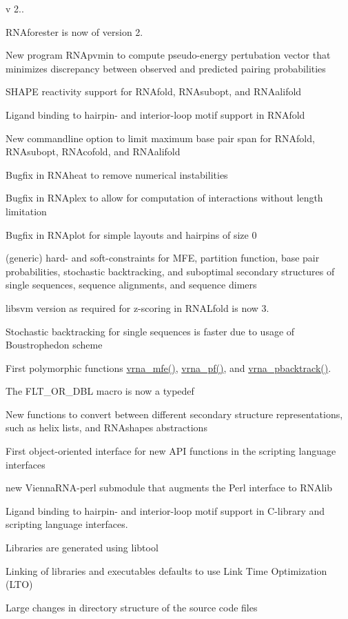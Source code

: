 v 2..
\begin{DoxyItemize}
\item R\+N\+Aforester is now of version 2.
\item New program R\+N\+Apvmin to compute pseudo-\/energy pertubation vector that minimizes discrepancy between observed and predicted pairing probabilities
\item S\+H\+A\+PE reactivity support for R\+N\+Afold, R\+N\+Asubopt, and R\+N\+Aalifold
\item Ligand binding to hairpin-\/ and interior-\/loop motif support in R\+N\+Afold
\item New commandline option to limit maximum base pair span for R\+N\+Afold, R\+N\+Asubopt, R\+N\+Acofold, and R\+N\+Aalifold
\item Bugfix in R\+N\+Aheat to remove numerical instabilities
\item Bugfix in R\+N\+Aplex to allow for computation of interactions without length limitation
\item Bugfix in R\+N\+Aplot for simple layouts and hairpins of size 0
\item (generic) hard-\/ and soft-\/constraints for M\+FE, partition function, base pair probabilities, stochastic backtracking, and suboptimal secondary structures of single sequences, sequence alignments, and sequence dimers
\item libsvm version as required for z-\/scoring in R\+N\+A\+Lfold is now 3.
\item Stochastic backtracking for single sequences is faster due to usage of Boustrophedon scheme
\item First polymorphic functions \hyperlink{group__mfe__fold_gabd3b147371ccf25c577f88bbbaf159fd}{vrna\+\_\+mfe()}, \hyperlink{group__pf__fold_ga29e256d688ad221b78d37f427e0e99bc}{vrna\+\_\+pf()}, and \hyperlink{group__subopt__stochbt_ga901fe42a33b07be083421741bf7dc610}{vrna\+\_\+pbacktrack()}.
\item The F\+L\+T\+\_\+\+O\+R\+\_\+\+D\+BL macro is now a typedef
\item New functions to convert between different secondary structure representations, such as helix lists, and R\+N\+Ashapes abstractions
\item First object-\/oriented interface for new A\+PI functions in the scripting language interfaces
\item new Vienna\+R\+N\+A-\/perl submodule that augments the Perl interface to R\+N\+Alib
\item Ligand binding to hairpin-\/ and interior-\/loop motif support in C-\/library and scripting language interfaces.
\item Libraries are generated using libtool
\item Linking of libraries and executables defaults to use Link Time Optimization (L\+TO)
\item Large changes in directory structure of the source code files
\end{DoxyItemize}

